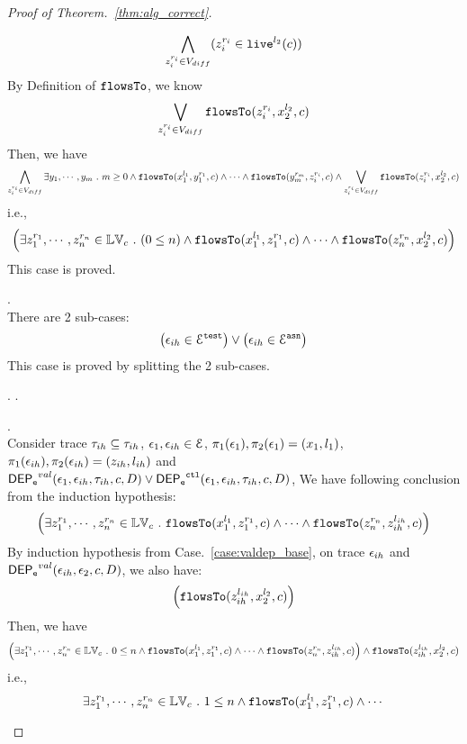 \begin{proof}[Proof of Theorem.~\ref{thm:alg_correct}]
\begin{case}
\begin{subcase}
\[
  \bigwedge_{z_i^{r_i} \in V_{diff}} (z_i^{r_i} \in \mathtt{live}^{l_2}(c))
\]
%
By Definition of $\mathtt{flowsTo}$, we know
\[
   \bigvee_{z_i^{r_i} \in V_{diff}}  \mathtt{flowsTo}(z_i^{r_i}, x_2^{l_2}, c)
\]
%
%
%
Then, we have
\[
  \bigwedge_{z_i^{r_i} \in V_{diff}}
  \exists y_1, \cdots, y_m ~.~ 
  m \geq 0 \land
  \mathtt{flowsTo}(x_1^{l_1}, y_1^{r_1}, c) \land \cdots \land \mathtt{flowsTo}(y_m^{r_m}, z_i^{r_i}, c) \land 
   \bigvee_{z_i^{r_i} \in V_{diff}}  \mathtt{flowsTo}(z_i^{r_i}, x_2^{l_2}, c)
\]
i.e.,
\[
\Big(\exists z_1^{r_1}, \cdots, z_n^{r_n} \in \mathbb{LV}_{{c}} ~.~ (0 \leq n  )
 \land \mathtt{flowsTo}(x_1^{l_1}, z_1^{r_1}, c) \land \cdots \land \mathtt{flowsTo}(z_n^{r_n}, {x}_2^{l_2}, c) \Big)
\]
This case is proved.
\end{subcase}
%
\begin{subcase}
\label{case:valdep_ihdep}.
\\
There are 2 sub-cases: 
%
 \[
 \big(\mathtt{\epsilon}_{ih} \in \mathcal{E}^{\mathtt{{test}}}\big) \lor \big(\mathtt{\epsilon}_{ih} \in \mathcal{E}^{\mathtt{{asn}}}\big)
 \]
%
This case is proved by splitting the 2 sub-cases.
\begin{subsubcase}.
\label{case:valdep_ihdepasn}.
\begin{subsubsubcase}.
\\
Consider trace $\mathtt{\tau}_{ih} \subseteq \mathtt{\tau}_{ih}$,  $\mathtt{\epsilon}_1, \mathtt{\epsilon}_{ih} \in \mathcal{E}$, 
$\pi_1(\mathtt{\epsilon}_1), \pi_2(\mathtt{\epsilon}_1) = (x_1, l_1)$, $\pi_1(\mathtt{\epsilon}_{ih}), \pi_2(\mathtt{\epsilon}_{ih}) = (z_{ih}, l_{ih})$ and
$\mathsf{DEP_{\mathtt{e}}}^{val}(\mathtt{\epsilon}_1, \mathtt{\epsilon}_{ih}, \mathtt{\tau}_{ih}, c, D) \lor \mathsf{DEP_{\mathtt{e}}}^{\mathtt{{ctl}}}(\mathtt{\epsilon}_1, \mathtt{\epsilon}_{ih}, \mathtt{\tau}_{ih}, c, D) $, 
We have following conclusion from the induction hypothesis:
%
\[
\Big(\exists z_1^{r_1}, \cdots, z_n^{r_n} \in \mathbb{LV}_{{c}} ~.~ \mathtt{flowsTo}(x_1^{l_1}, z_1^{r_1}, c) \land \cdots \land \mathtt{flowsTo}(z_n^{r_n}, z_{ih}^{l_{ih}}, c) \Big)
\]
%
By induction hypothesis from Case.~\ref{case:valdep_base}, on trace $\mathtt{\epsilon}_{ih}$ and $\mathsf{DEP_{\mathtt{e}}}^{val}(\mathtt{\epsilon}_{ih}, \mathtt{\epsilon}_2, c, D)$,
we also have:
\[
\Big( \mathtt{flowsTo}(z_{ih}^{l_{ih}}, {x}_2^{l_2}, c) \Big)
\]
%
Then, we have
%
\[
\Big(\exists z_1^{r_1}, \cdots, z_n^{r_n} \in \mathbb{LV}_{{c}} ~.~  0 \leq n \land
 \mathtt{flowsTo}(x_1^{l_1}, z_1^{r_1}, c) \land \cdots \land \mathtt{flowsTo}(z_n^{r_n}, z_{ih}^{l_{ih}}, c)
  \Big)\land \mathtt{flowsTo}(z_{ih}^{l_{ih}}, {x}_2^{l_2}, c)
\]
%
i.e.,
\[
\exists z_1^{r_1}, \cdots, z_n^{r_n} \in \mathbb{LV}_{{c}} ~.~ 1 \leq n \land \mathtt{flowsTo}(x_1^{l_1}, z_1^{r_1}, c) \land \cdots 
\]
\end{subsubsubcase}
\end{subsubcase}
\end{subcase}
\end{case}
\end{proof}
